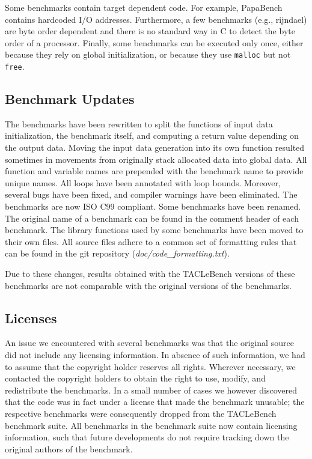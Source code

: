 \documentclass[a4paper,UKenglish]{oasics-v2016}
\newcommand{\todo}[1]{{\emph{TODO: #1}}}
\newcommand{\martin}[1]{{\color{blue} Martin: #1}}
\newcommand{\code}[1]{{\small{\texttt{#1}}}}
\renewcommand{\todo}[1]{}
\renewcommand{\martin}[1]{}
\begin{document}
\martin{Mmh, I think we need to fix this. The simplest form is dropping them
from the list. How many benchmarks depend on byte ordering?}
Some benchmarks contain target dependent code.
For example, PapaBench contains hardcoded I/O addresses.
Furthermore, a few benchmarks (e.g., rijndael) are byte order dependent
and there is no standard way in C to detect the byte order of a processor.
Finally, some benchmarks can be executed only once, either because
they rely on global initialization, or because they use \code{malloc} but not \code{free}.


\subsection{Benchmark Updates}

The benchmarks have been rewritten to split the functions of
input data initialization, the benchmark itself, and computing a return
value depending on the output data. Moving the input data generation
into its own function resulted sometimes in movements from originally
stack allocated data into global data.
All function and variable names are prepended with the benchmark
name to provide unique names.
All loops have been annotated with loop bounds.
Moreover, several bugs have been fixed, and compiler warnings have been eliminated.
The benchmarks are now ISO C99 compliant.
Some benchmarks have been renamed. The original name of a benchmark can be found in the comment header of each benchmark.
The library functions used by some benchmarks have been moved to their own files.
All source files adhere to a common set of formatting rules that can be found in the git repository (\textit{doc/code\_formatting.txt}).


Due to these changes, results obtained with the TACLeBench versions
of these benchmarks are not comparable with the original versions of
the benchmarks.


\subsection{Licenses}

An issue we encountered with several benchmarks was that the original
source did not include any licensing information. In absence of such
information, we had to assume that the copyright holder reserves all
rights. Wherever necessary, we contacted the copyright holders to
obtain the right to use, modify, and redistribute the benchmarks. In a
small number of cases we however discovered that the code was in fact
under a license that made the benchmark unusable; the respective
benchmarks were consequently dropped from the TACLeBench benchmark
suite. All benchmarks in the benchmark suite now contain licensing
information, such that future developments do not require tracking
down the original authors of the benchmark.
\end{document}
